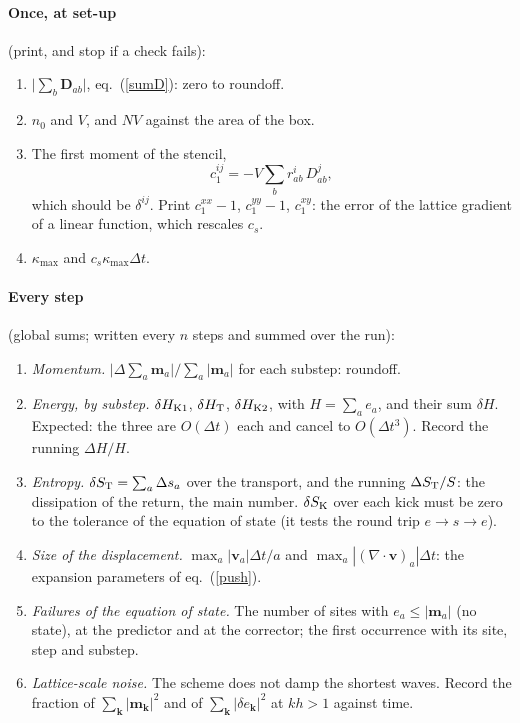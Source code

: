 \documentclass[11pt,aps,preprint,nofootinbib,superscriptaddress,tightenlines]{revtex4-2}
\def\st{\begin{equation}}
\def\stp{\end{equation}}
\def\Eq#1{eq.~(\ref{#1})}
\let\oldparagraph\paragraph
\renewcommand{\paragraph}{\par\bigskip\oldparagraph}
\begin{document}
\paragraph{Once, at set-up} (print, and stop if a check fails):
\begin{enumerate}
\item $\big|\sum_b\bm D_{ab}\big|$, \Eq{sumD}: zero to roundoff.
\item $n_0$ and $V$, and $N V$ against the area of the box.
\item The first moment of the stencil,
  \st
  c_1^{ij}=-V\sum_b r_{ab}^i\,D_{ab}^j ,
  \stp
  which should be $\delta^{ij}$.  Print $c_1^{xx}-1$, $c_1^{yy}-1$, $c_1^{xy}$: the
  error of the lattice gradient of a linear function, which rescales $c_s$.
\item $\kappa_{\max}$ and $c_s\kappa_{\max}\Delta t$.
\end{enumerate}

\paragraph{Every step} (global sums; written every $n$ steps and summed over the run):
\begin{enumerate}
\item \emph{Momentum.}  $\big|\Delta\sum_a\bm m_a\big|\big/\sum_a|\bm m_a|$ for each
  substep: roundoff.
\item \emph{Energy, by substep.}  $\delta H_{\rm K1}$, $\delta H_{\rm T}$,
  $\delta H_{\rm K2}$, with $H=\sum_ae_a$, and their sum $\delta H$.  Expected: the
  three are $O(\Delta t)$ each and cancel to $O(\Delta t^3)$.  Record the running
  $\Delta H/H$.
\item \emph{Entropy.}  $\delta S_{\rm T}=\sum_a\Delta s_a$ over the transport, and the
  running $\Delta S_{\rm T}/S$: the dissipation of the return, the main number.
  $\delta S_{\rm K}$ over each kick must be zero to the tolerance of the equation of
  state (it tests the round trip $e\to s\to e$).
\item \emph{Size of the displacement.}  $\max_a|\bm v_a|\Delta t/a$ and
  $\max_a|(\nabla\cdot\bm v)_a|\Delta t$: the expansion parameters of \Eq{push}.
\item \emph{Failures of the equation of state.}  The number of sites with
  $e_a\le|\bm m_a|$ (no state), at the predictor and at the corrector; the first
  occurrence with its site, step and substep.
\item \emph{Lattice-scale noise.}  The scheme does not damp the shortest waves.
  Record the fraction of $\sum_{\bm k}|\bm m_{\bm k}|^2$ and of
  $\sum_{\bm k}|\delta e_{\bm k}|^2$ at $kh>1$ against time.
\end{enumerate}
\end{document}

